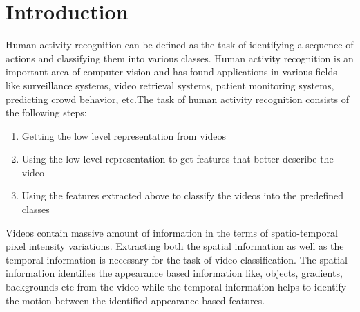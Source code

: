 \chapter{Introduction}\label{Introduction}
\thispagestyle{empty}
\setlength{\parskip}{10pt plus 5pt minus 3pt}
\setlength{\parindent}{20pt}%

Human activity recognition can be defined as the task of identifying a sequence of actions and classifying them into various classes. Human activity recognition is an important area of computer vision and has found applications in various fields like 
surveillance systems, video retrieval systems, patient monitoring systems, predicting crowd behavior, etc.The task of human activity recognition consists of the following steps:\begin{enumerate}
\item Getting the low level representation from videos
\item Using the low level representation to get features that better describe the video
\item Using the features extracted above to classify the videos into the predefined classes
\end{enumerate}

Videos contain massive amount of information in the terms of spatio-temporal pixel  intensity variations. Extracting both the spatial information as well as the temporal information is necessary for the task of video classification. The spatial information identifies the appearance based information like, objects, gradients, backgrounds etc from the video while the temporal information helps to identify the motion between the identified appearance based features.

